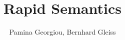 



	

\title{Rapid Semantics}
\author{
	Pamina Georgiou, Bernhard Gleiss
}


\begin{titlepage}


\maketitle

\end{titlepage}








